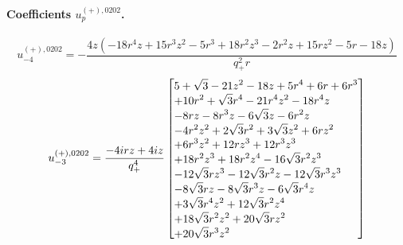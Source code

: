 \documentclass[11pt,a4paper]{article}
\begin{document}
\paragraph{Coefficients $u_p^{(+),0202}$.}
\begin{equation}
u_{-4}^{(+),0202}=- \frac{4 z \left(- 18 r^{4} z + 15 r^{3} z^{2} - 5 r^{3} + 18 r^{2} z^{3} - 2 r^{2} z + 15 r z^{2} - 5 r - 18 z\right)}{q_{+}^{2} r}
\label{eq:cat-auxiliary-plus-0202-m4}
\end{equation}
\begin{equation}
u_{-3}^{(+),0202}=\frac{- 4 i r z + 4 i z}{q_{+}^{4}}\left[\vcenter{\hbox{\shortstack[l]{$\displaystyle 5 + \sqrt{3} - 21 z^{2} - 18 z + 5 r^{4} + 6 r + 6 r^{3}$\\
$\displaystyle  + 10 r^{2} + \sqrt{3} r^{4} - 21 r^{4} z^{2} - 18 r^{4} z$\\
$\displaystyle  - 8 r z - 8 r^{3} z - 6 \sqrt{3} z - 6 r^{2} z$\\
$\displaystyle  - 4 r^{2} z^{2} + 2 \sqrt{3} r^{2} + 3 \sqrt{3} z^{2} + 6 r z^{2}$\\
$\displaystyle  + 6 r^{3} z^{2} + 12 r z^{3} + 12 r^{3} z^{3}$\\
$\displaystyle  + 18 r^{2} z^{3} + 18 r^{2} z^{4} - 16 \sqrt{3} r^{2} z^{3}$\\
$\displaystyle  - 12 \sqrt{3} r z^{3} - 12 \sqrt{3} r^{2} z - 12 \sqrt{3} r^{3} z^{3}$\\
$\displaystyle  - 8 \sqrt{3} r z - 8 \sqrt{3} r^{3} z - 6 \sqrt{3} r^{4} z$\\
$\displaystyle  + 3 \sqrt{3} r^{4} z^{2} + 12 \sqrt{3} r^{2} z^{4}$\\
$\displaystyle  + 18 \sqrt{3} r^{2} z^{2} + 20 \sqrt{3} r z^{2}$\\
$\displaystyle  + 20 \sqrt{3} r^{3} z^{2}$}}}\right]
\label{eq:cat-auxiliary-plus-0202-m3}
\end{equation}
\end{document}
